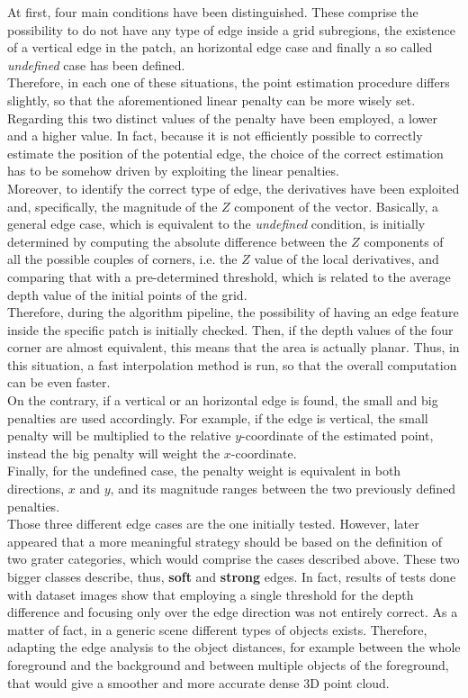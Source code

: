 At first, four main conditions have been distinguished. 
These comprise the possibility to do not have any type of edge inside a grid subregions, the existence of a vertical edge in the patch, an horizontal edge case and finally a so called \textit{undefined} case has been defined.\\
Therefore, in each one of these situations, the point estimation procedure differs slightly, so that the aforementioned linear penalty can be more wisely set.
Regarding this two distinct values of the penalty have been employed, a lower and a higher value.
In fact, because it is not efficiently possible to correctly estimate the position of the potential edge, the choice of the correct estimation has to be somehow driven by exploiting the linear penalties. \\
Moreover, to identify the correct type of edge, the derivatives have been exploited and, specifically, the magnitude of the $Z$ component of the vector. 
Basically, a general edge case, which is equivalent to the \textit{undefined} condition, is initially determined by computing the absolute difference between the $Z$ components of all the possible couples of corners, i.e. the $Z$ value of the local derivatives, and comparing that with a pre-determined threshold, which is related to the average depth value of the initial points of the grid. \\
Therefore, during the algorithm pipeline, the possibility of having an edge feature inside the specific patch is initially checked.
Then, if the depth values of the four corner are almost equivalent, this means that the area is actually planar.
Thus, in this situation, a fast interpolation method is run, so that the overall computation can be even faster.\\
On the contrary, if a vertical or an horizontal edge is found, the small and big penalties are used accordingly.
For example, if the edge is vertical, the small penalty will be multiplied to the relative $y$-coordinate of the estimated point, instead the big penalty will weight the $x$-coordinate.\\
Finally, for the undefined case, the penalty weight is equivalent in both directions, $x$ and $y$, and its magnitude ranges between the two previously defined penalties. \\
Those three different edge cases are the one initially tested. 
However, later appeared that a more meaningful strategy should be based on the definition of two grater categories, which would comprise the cases described above.
These two bigger classes describe, thus, \textbf{soft} and \textbf{strong} edges. 
In fact, results of tests done with dataset images show that employing a single threshold for the depth difference and focusing only over the edge direction was not entirely correct. 
As a matter of fact, in a generic scene different types of objects exists. 
Therefore, adapting the edge analysis to the object distances, for example between the whole foreground and the background and between multiple objects of the foreground, that would give a smoother and more accurate dense 3D point cloud.

